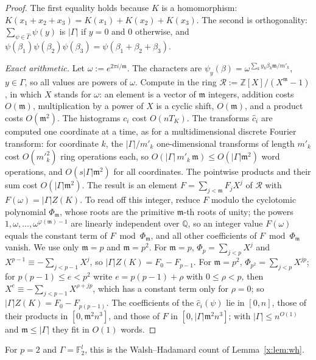 \documentclass[11pt]{article}
\theoremstyle{definition}
\theoremstyle{remark}
\newcommand{\Z}{\mathbb{Z}}
\newcommand{\F}{\mathbb{F}_2}
\newcommand{\Q}{\mathbb{Q}}
\begin{document}
\begin{proof}
The first equality holds because $K$ is a homomorphism: $K(x_1+x_2+x_3)=K(x_1)+K(x_2)+K(x_3)$. The second is orthogonality: $\sum_{\psi\in\hat\Gamma}\psi(y)$ is $|\Gamma|$ if $y=0$ and $0$ otherwise, and $\psi(\beta_1)\psi(\beta_2)\psi(\beta_3)=\psi(\beta_1+\beta_2+\beta_3)$.

\emph{Exact arithmetic.} Let $\omega:=e^{2\pi i/\mathfrak m}$. The characters are $\psi_y(\beta)=\omega^{\sum_k y_k\beta_k\mathfrak m/m'_k}$, $y\in\Gamma$, so all values are powers of $\omega$. Compute in the ring $\mathcal R:=\Z[X]/(X^{\mathfrak m}-1)$, in which $X$ stands for $\omega$: an element is a vector of $\mathfrak m$ integers, addition costs $O(\mathfrak m)$, multiplication by a power of $X$ is a cyclic shift, $O(\mathfrak m)$, and a product costs $O(\mathfrak m^2)$. The histograms $c_i$ cost $O(nT_K)$. The transforms $\hat c_i$ are computed one coordinate at a time, as for a multidimensional discrete Fourier transform: for coordinate $k$, the $|\Gamma|/m'_k$ one-dimensional transforms of length $m'_k$ cost $O(m'^2_k)$ ring operations each, so $O(|\Gamma|\,m'_k\,\mathfrak m)\le O(|\Gamma|\mathfrak m^2)$ word operations, and $O(s|\Gamma|\mathfrak m^2)$ for all coordinates. The pointwise products and their sum cost $O(|\Gamma|\mathfrak m^2)$. The result is an element $F=\sum_{j<\mathfrak m}F_jX^j$ of $\mathcal R$ with $F(\omega)=|\Gamma|Z(K)$. To read off this integer, reduce $F$ modulo the cyclotomic polynomial $\Phi_{\mathfrak m}$, whose roots are the primitive $\mathfrak m$-th roots of unity; the powers $1,\omega,\dots,\omega^{\varphi(\mathfrak m)-1}$ are linearly independent over $\Q$, so an integer value $F(\omega)$ equals the constant term of $F\bmod\Phi_{\mathfrak m}$, and all other coefficients of $F\bmod\Phi_{\mathfrak m}$ vanish. We use only $\mathfrak m=p$ and $\mathfrak m=p^2$. For $\mathfrak m=p$, $\Phi_p=\sum_{j<p}X^j$ and $X^{p-1}\equiv-\sum_{j<p-1}X^j$, so $|\Gamma|Z(K)=F_0-F_{p-1}$. For $\mathfrak m=p^2$, $\Phi_{p^2}=\sum_{j<p}X^{jp}$; for $p(p-1)\le e<p^2$ write $e=p(p-1)+\rho$ with $0\le\rho<p$, then $X^e\equiv-\sum_{j<p-1}X^{\rho+jp}$, which has a constant term only for $\rho=0$; so $|\Gamma|Z(K)=F_0-F_{p(p-1)}$. The coefficients of the $\hat c_i(\psi)$ lie in $[0,n]$, those of their products in $[0,\mathfrak m^2n^3]$, and those of $F$ in $[0,|\Gamma|\mathfrak m^2n^3]$; with $|\Gamma|\le n^{O(1)}$ and $\mathfrak m\le|\Gamma|$ they fit in $O(1)$ words.
\end{proof}

For $p=2$ and $\Gamma=\F^l$, this is the Walsh--Hadamard count of Lemma~\ref{x:lem:wh}.
\end{document}
